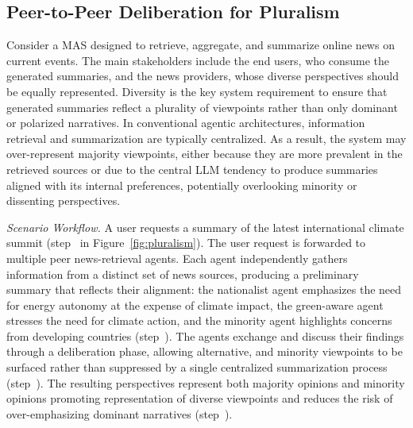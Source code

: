 \documentclass[sigconf,nonacm]{acmart}
\begin{document}
\subsection{Peer-to-Peer Deliberation for Pluralism}
Consider a MAS designed to retrieve, aggregate, and summarize online news on current events.
The main stakeholders include the end users, who consume the generated summaries, and the news providers, whose diverse perspectives should be equally represented.
Diversity is the key system requirement to ensure that generated summaries reflect a plurality of viewpoints rather than only dominant or polarized narratives.
In conventional agentic architectures, information retrieval and summarization are typically centralized.
As a result, the system may over-represent majority viewpoints, either because they are more prevalent in the retrieved sources or due to the central LLM tendency to produce summaries aligned with its internal preferences, potentially overlooking minority or dissenting perspectives.

\textit{Scenario Workflow.}
A user requests a summary of the latest international climate summit (step~ in Figure~\ref{fig:pluralism}).
The user request is forwarded to multiple peer news-retrieval agents.
Each agent independently gathers information from a distinct set of news sources, producing a preliminary summary that reflects their alignment:
the nationalist agent emphasizes the need for energy autonomy at the expense of climate impact, the green-aware agent stresses the need for climate action, and the minority agent highlights concerns from developing countries (step~).
The agents exchange and discuss their findings through a deliberation phase, allowing alternative, and minority viewpoints to be surfaced rather than suppressed by a single centralized summarization process (step~).
The resulting perspectives represent both majority opinions and minority opinions promoting representation of diverse viewpoints and reduces the risk of over-emphasizing dominant narratives (step~).
\end{document}
